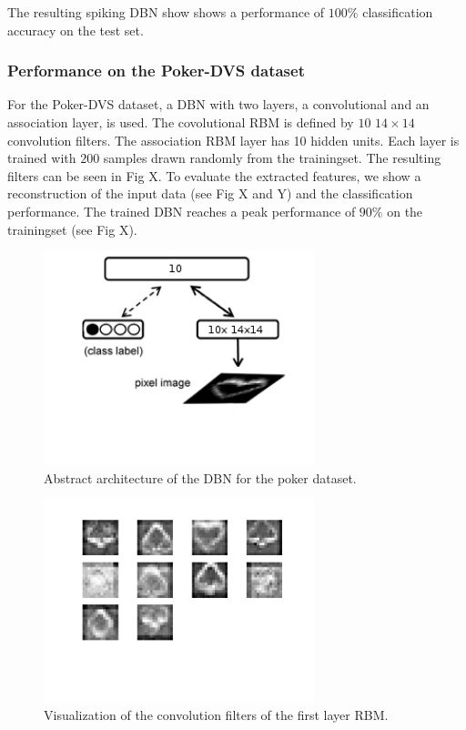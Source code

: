 The resulting spiking DBN show shows a performance of $100 \%$ classification accuracy on the test set. 


\subsubsection{Performance on the Poker-DVS dataset}

For the Poker-DVS dataset, a DBN with two layers, a convolutional and an association layer, is used.
The covolutional RBM is defined by $10$ $14 \times 14$ convolution filters.
The association RBM layer has 10 hidden units.
Each layer is trained with $200$ samples drawn randomly from the trainingset.
The resulting filters can be seen in Fig X.
To evaluate the extracted features, we show a reconstruction of the input data (see Fig X and Y) and the classification performance. 
The trained DBN reaches a peak performance of $90 \%$ on the trainingset (see Fig X).


\begin{figure}[h!]
	\centering
    	\includegraphics[width=0.7\textwidth]{imgs/poker/dbn_poker.png} 
    \caption{Abstract architecture of the DBN for the poker dataset.}
	\label{fig:rbmw}
\end{figure}

\begin{figure}[h!]
	\centering
    	\includegraphics[width=0.7\textwidth]{imgs/poker/w2.png} 
    \caption{Visualization of the convolution filters of the first layer RBM.}
	\label{fig:rbmw}
\end{figure}

